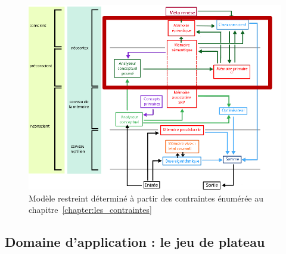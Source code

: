 \begin{figure}[H] 
\includegraphics[width=\textwidth]{files/modele_restreint} 
\caption{Modèle restreint déterminé à partir des contraintes énumérée au chapitre~\ref{chapter:les_contraintes}} 
\label{modele_restreint}
\end{figure}

\subsection{Domaine d'application : le jeu de plateau}
\label{section:domaine_application_le_jeu_de_plateau}

